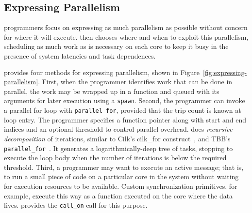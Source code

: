 \subsection{Expressing Parallelism}

\Grappa programmers focus on expressing as much parallelism as possible
without concern for where it will execute. \Grappa then chooses where and when
to exploit this parallelism, scheduling as much work as is necessary on each
core to keep it busy in the presence of system latencies and task dependences.

\Grappa provides four methods for expressing parallelism, shown in
Figure~\ref{fig:expressing-parallelism}. First, when the programmer identifies
work that can be done in parallel, the work may be wrapped up in a function
and queued with its arguments for later execution using a \texttt{spawn}.
Second,
the programmer can invoke a parallel for loop with \texttt{parallel\_for}, provided that the trip count is
known at loop entry. The programmer specifies a function pointer along with
start and end indices and an optional threshold to control parallel overhead.
\Grappa does {\em recursive decomposition} of iterations, similar to Cilk's
cilk\_for construct~\cite {cilkforimplementation}, and TBB's {\tt
parallel\_for}~\cite{intel_tbb}. It generates a logarithmically-deep tree of
tasks, stopping to execute the loop body when the number of iterations is
below the required threshold. Third, a programmer may want to execute an active message; that is, to run a
small piece of code on a particular core in the system without waiting for
execution resources to be available. Custom synchronization primitives, for example, execute this way as a function executed on the core where the data
lives. \Grappa provides the \texttt{call\_on} call for this purpose.

